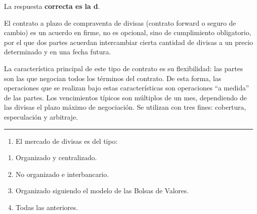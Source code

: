 \documentclass[
  letterpaper,
  DIV=11,
  numbers=noendperiod]{scrreprt}
\providecommand{\tightlist}{%
  \setlength{\itemsep}{0pt}\setlength{\parskip}{0pt}}\usepackage{longtable,booktabs,array}
\begin{document}
\begin{tcolorbox}[enhanced jigsaw, left=2mm, opacityback=0, colback=white, breakable, arc=.35mm, bottomrule=.15mm, rightrule=.15mm, toprule=.15mm, leftrule=.75mm, colframe=quarto-callout-tip-color-frame]
\begin{minipage}[t]{5.5mm}
\textcolor{quarto-callout-tip-color}{\faLightbulb}
\end{minipage}%
\begin{minipage}[t]{\textwidth - 5.5mm}

La respuesta \textbf{correcta es la d}.

El contrato a plazo de compraventa de divisas (contrato forward o seguro
de cambio) es un acuerdo en firme, no es opcional, sino de cumplimiento
obligatorio, por el que dos partes acuerdan intercambiar cierta cantidad
de divisas a un precio determinado y en una fecha futura.

La característica principal de este tipo de contrato es su flexibilidad:
las partes son las que negocian todos los términos del contrato. De esta
forma, las operaciones que se realizan bajo estas características son
operaciones ``a medida'' de las partes. Los vencimientos típicos son
múltiplos de un mes, dependiendo de las divisas el plazo máximo de
negociación. Se utilizan con tres fines: cobertura, especulación y
arbitraje.

\end{minipage}%
\end{tcolorbox}

\begin{center}\rule{0.5\linewidth}{0.5pt}\end{center}

\begin{enumerate}
\def\labelenumi{\arabic{enumi}.}
\setcounter{enumi}{6}
\tightlist
\item
  El mercado de divisas es del tipo:
\end{enumerate}

\begin{enumerate}
\def\labelenumi{\alph{enumi})}
\item
  Organizado y centralizado.
\item
  No organizado e interbancario.
\item
  Organizado siguiendo el modelo de las Bolsas de Valores.
\item
  Todas las anteriores.
\end{enumerate}
\end{document}
